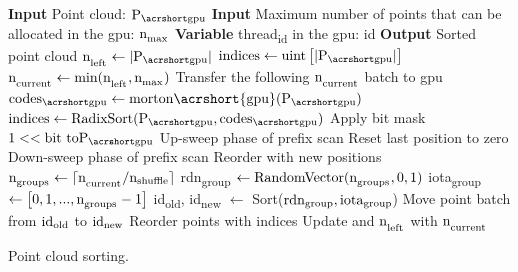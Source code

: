 \begin{algorithm}
  \begin{algorithmic}[1]
    \small
    \State \textbf{Input} Point cloud: $\Points$ %
    \State \textbf{Input} Maximum number of points that can be allocated in the \acrshort{gpu}: $\textrm{n}_\textsubscript{max}$ %
    \State \textbf{Variable} \textrm{thread}\textsubscript{id} in the \acrshort{gpu}: id %
    \State \textbf{Output} Sorted point cloud %
    \State $\LeftPoints \gets \PCCardinality$ %
    \State $\textrm{indices} \gets \textrm{uint}\left[\PCCardinality\right]$ %
        \State $\textrm{n}_\textsubscript{current} \gets \textrm{min}(\textrm{n}_\textsubscript{left}, \textrm{n}_\textsubscript{max})$ %
        \State Transfer the following $\textrm{n}_\textsubscript{current}$ batch to \acrshort{gpu} %
            \State $\Codes \gets \textrm{morton\acrshort{gpu}}(\Points)$ %
            \State $\textrm{indices} \gets \textrm{RadixSort}(\Points, \Codes)$ %
                    \State Apply bit mask $1 << \textrm{bit to} \Points$ %
                    \State Up-sweep phase of prefix scan %
                    \State Reset last position to zero %
                    \State Down-sweep phase of prefix scan %
                    \State Reorder \Points with new positions %
                \EndFor
            \EndProcedure
        \EndProcedure
                \State $\textrm{n}_\textsubscript{groups} \gets \lceil \textrm{n}_\textsubscript{current} / \textrm{n}\textsubscript{shuffle} \rceil$ %
                \State rdn\textsubscript{group} $\gets \textrm{RandomVector}(\textrm{n}_\textsubscript{groups}, 0, 1)$ %
                \State iota\textsubscript{group} $\gets \bigl[0, 1, ..., \textrm{n}_\textsubscript{groups}-1 \bigr]$ %
                \State id\textsubscript{old}, id\textsubscript{new} $\gets$ Sort($\textrm{rdn\textsubscript{group}}, \textrm{iota}\textsubscript{group}$) %
                    \State Move point batch from $\textrm{id}\textsubscript{old}$ to $\textrm{id}\textsubscript{new}$ %
                \EndFor
            \Else
                \State Reorder points with indices %
            \EndIf
        \EndProcedure
        \State Update \Points \Space and $\textrm{n}_\textsubscript{left}$ with $\textrm{n}_\textsubscript{current}$ %
    \EndWhile
    \caption{Point cloud sorting.}
    \label{alg:sorting}
  \end{algorithmic}
  \normalsize
\end{algorithm}

